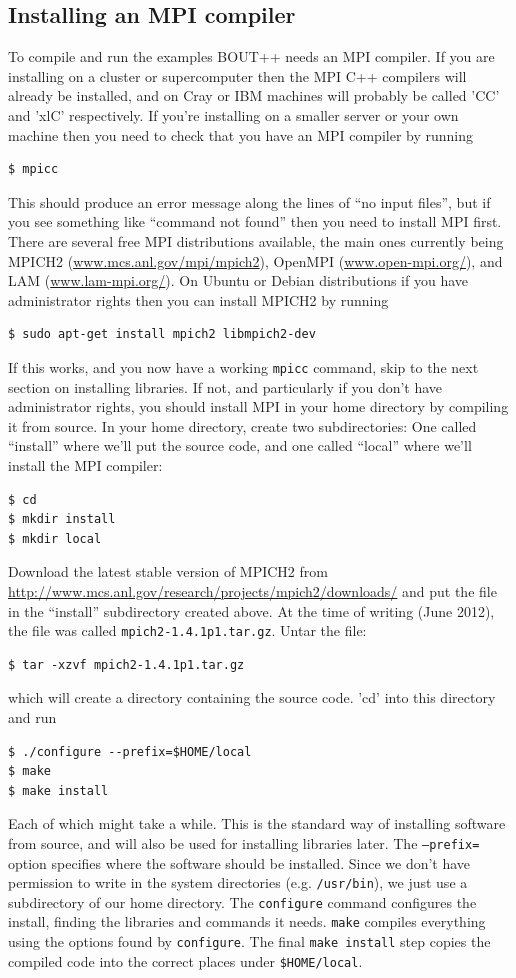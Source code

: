 \documentclass[12pt]{article}
\begin{document}
\subsection{Installing an MPI compiler}
%
\label{sec:installmpi}
%
To compile and run the examples BOUT++ needs an MPI compiler.  If you are
installing on a cluster or supercomputer then the MPI C++ compilers will
already be installed, and on Cray or IBM machines will probably be called 'CC'
and 'xlC' respectively.  If you're installing on a smaller server or your own
machine then you need to check that you have an MPI compiler by running
%
\begin{verbatim}
$ mpicc
\end{verbatim}
%
This should produce an error message along the lines of ``no input files'', but
if you see something like ``command not found'' then you need to install MPI
first.  There are several free MPI distributions available, the main ones
currently being MPICH2 (\url{www.mcs.anl.gov/mpi/mpich2}), OpenMPI
(\url{www.open-mpi.org/}), and LAM (\url{www.lam-mpi.org/}).  On Ubuntu or
Debian distributions if you have administrator rights then you can install
MPICH2 by running
%
\begin{verbatim}
$ sudo apt-get install mpich2 libmpich2-dev
\end{verbatim}
%
If this works, and you now have a working \texttt{mpicc} command, skip to the
next section on installing libraries. If not, and particularly if you don't
have administrator rights, you should install MPI in your home directory by
compiling it from source.  In your home directory, create two subdirectories:
One called ``install'' where we'll put the source code, and one called
``local'' where we'll install the MPI compiler:
%
\begin{verbatim}
$ cd
$ mkdir install
$ mkdir local
\end{verbatim}
%
Download the latest stable version of MPICH2 from
\url{http://www.mcs.anl.gov/research/projects/mpich2/downloads/} and put the
file in the ``install'' subdirectory created above. At the time of writing
(June 2012), the file was called \texttt{mpich2-1.4.1p1.tar.gz}. Untar the
file:
%
\begin{verbatim}
$ tar -xzvf mpich2-1.4.1p1.tar.gz
\end{verbatim}
%
which will create a directory containing the source code. 'cd' into this
directory and run
%
\begin{verbatim}
$ ./configure --prefix=$HOME/local
$ make
$ make install
\end{verbatim}
%
Each of which might take a while. This is the standard way of installing
software from source, and will also be used for installing libraries later. The
\texttt{--prefix=} option specifies where the software should be installed.
Since we don't have permission to write in the system directories (e.g.
\texttt{/usr/bin}), we just use a subdirectory of our home directory. The
\texttt{configure} command configures the install, finding the libraries and
commands it needs. \texttt{make} compiles everything using the options found by
\texttt{configure}. The final \texttt{make install} step copies the compiled
code into the correct places under \texttt{\$HOME/local}.
\end{document}

